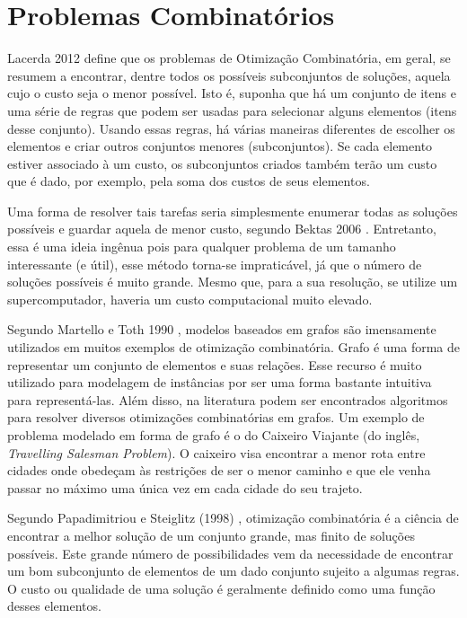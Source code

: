 \chapter{Problemas Combinatórios}



Lacerda 2012 \cite{de2012nova} define que os problemas de Otimização Combinatória, em geral, se resumem a encontrar, dentre todos os possíveis subconjuntos de soluções, aquela cujo o custo seja o menor possível. Isto é, suponha que há um conjunto de itens e uma série de regras que podem ser usadas para selecionar alguns elementos (itens desse conjunto). Usando essas regras, há várias maneiras diferentes de escolher os elementos e criar outros conjuntos menores (subconjuntos). Se cada elemento estiver associado à um custo, os subconjuntos criados também terão um custo que é dado, por exemplo, pela soma dos custos de seus elementos.

Uma forma de resolver tais tarefas seria simplesmente enumerar todas as soluções possíveis e guardar aquela de menor custo, segundo Bektas 2006 \cite{bektas2006multiple}. Entretanto, essa é uma ideia ingênua pois para qualquer problema de um tamanho interessante (e útil), esse método torna-se impraticável, já que o número de soluções possíveis é muito grande. Mesmo que, para a sua resolução, se utilize um supercomputador, haveria um custo computacional muito elevado.

Segundo Martello e Toth 1990 \cite{Martello:1990:KPA:98124}, modelos baseados em grafos são imensamente utilizados em muitos exemplos de otimização combinatória. Grafo é uma forma de representar um conjunto de elementos e suas relações. Esse recurso é muito utilizado para modelagem de instâncias por ser uma forma bastante intuitiva para representá-las. Além disso, na literatura podem ser encontrados algoritmos para resolver diversos otimizações combinatórias em grafos. Um exemplo de problema modelado em forma de grafo é o do Caixeiro Viajante (do inglês, \textit{Travelling Salesman Problem}). O caixeiro visa encontrar a menor rota entre cidades onde obedeçam às restrições de ser o menor caminho e que ele venha passar no máximo uma única vez em cada cidade do seu trajeto.

Segundo Papadimitriou e Steiglitz (1998) \cite{papadimitriou1982combinatorial}, otimização combinatória é a ciência de encontrar a melhor solução de um conjunto grande, mas finito de soluções possíveis. Este grande número de possibilidades vem da necessidade de encontrar um bom subconjunto de elementos de um dado conjunto sujeito a algumas regras. O custo ou qualidade de uma solução é geralmente definido como uma função desses elementos.

